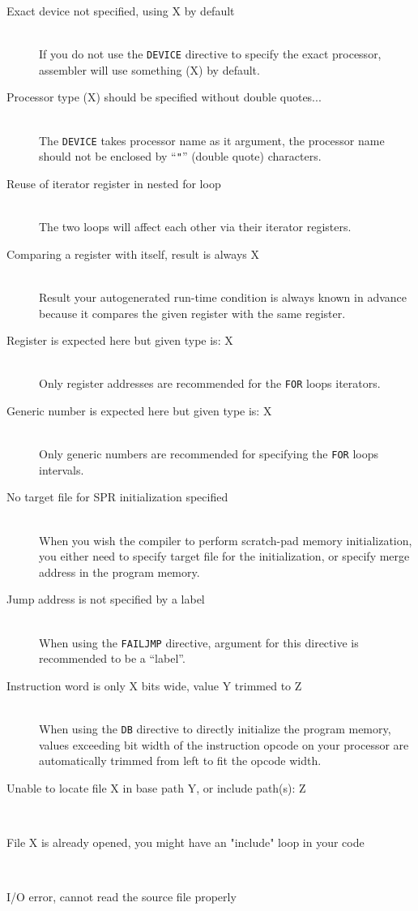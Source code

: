 \begin{description}
        \item[Exact device not specified, using X by default]~\\
            If you do not use the \texttt{DEVICE} directive to specify the exact processor, assembler will use something (X) by default.
        \item[Processor type (X) should be specified without double quotes...]~\\
            The \texttt{DEVICE} takes processor name as it argument, the processor name should not be enclosed by ``\texttt{"}'' (double quote) characters.
        \item[Reuse of iterator register in nested for loop]~\\
            The two loops will affect each other via their iterator registers.
        \item[Comparing a register with itself, result is always X]~\\
            Result your autogenerated run-time condition is always known in advance because it compares the given register with the same register.
        \item[Register is expected here but given type is: X]~\\
            Only register addresses are recommended for the \texttt{FOR} loops iterators.
        \item[Generic number is expected here but given type is: X]~\\
            Only generic numbers are recommended for specifying the \texttt{FOR} loops intervals.
        \item[No target file for SPR initialization specified]~\\
            When you wish the compiler to perform scratch-pad memory initialization, you either need to specify target file for the initialization, or specify merge address in the program memory.
        \item[Jump address is not specified by a label]~\\
            When using the \texttt{FAILJMP} directive, argument for this directive is recommended to be a ``label''.
        \item[Instruction word is only X bits wide, value Y trimmed to Z]~\\
            When using the \texttt{DB} directive to directly initialize the program memory, values exceeding bit width of the instruction opcode on your processor are automatically trimmed from left to fit the opcode width.
        \item[Unable to locate file X in base path Y, or include path(s): Z]~\\
        \item[File X is already opened, you might have an "include" loop in your code]~\\
        \item[I/O error, cannot read the source file properly]~\\
    \end{description}

